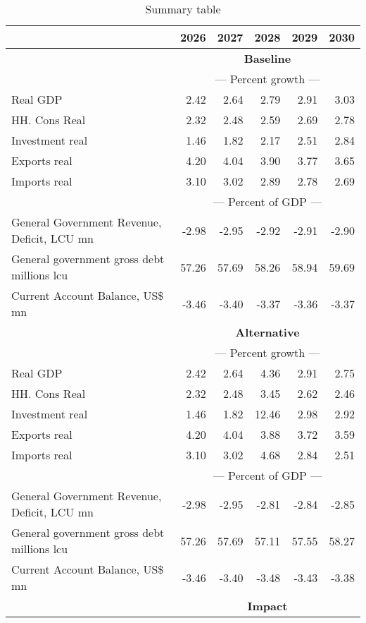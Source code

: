 \documentclass{article}
\begin{document}
\begin{table}[ht]
\caption{Summary table}
\begin{tabular}{lrrrrr}
\toprule
 & 2026 & 2027 & 2028 & 2029 & 2030 \\
\midrule
&\multicolumn{5}{c}{{\large \textbf{Baseline}}}                          \\
&\multicolumn{5}{c}{{---  Percent growth ---}}                          \\
Real GDP & 2.42 & 2.64 & 2.79 & 2.91 & 3.03 \\
HH. Cons Real & 2.32 & 2.48 & 2.59 & 2.69 & 2.78 \\
Investment real & 1.46 & 1.82 & 2.17 & 2.51 & 2.84 \\
Exports real & 4.20 & 4.04 & 3.90 & 3.77 & 3.65 \\
Imports real & 3.10 & 3.02 & 2.89 & 2.78 & 2.69 \\
&\multicolumn{5}{c}{{---  Percent of GDP ---}}                          \\
General Government Revenue, Deficit, LCU mn & -2.98 & -2.95 & -2.92 & -2.91 & -2.90 \\
General government gross debt millions lcu & 57.26 & 57.69 & 58.26 & 58.94 & 59.69 \\
Current Account Balance, US\$ mn & -3.46 & -3.40 & -3.37 & -3.36 & -3.37 \\
&\multicolumn{5}{c}{{\large \textbf{Alternative}}}                          \\
&\multicolumn{5}{c}{{---  Percent growth ---}}                          \\
Real GDP & 2.42 & 2.64 & 4.36 & 2.91 & 2.75 \\
HH. Cons Real & 2.32 & 2.48 & 3.45 & 2.62 & 2.46 \\
Investment real & 1.46 & 1.82 & 12.46 & 2.98 & 2.92 \\
Exports real & 4.20 & 4.04 & 3.88 & 3.72 & 3.59 \\
Imports real & 3.10 & 3.02 & 4.68 & 2.84 & 2.51 \\
&\multicolumn{5}{c}{{---  Percent of GDP ---}}                          \\
General Government Revenue, Deficit, LCU mn & -2.98 & -2.95 & -2.81 & -2.84 & -2.85 \\
General government gross debt millions lcu & 57.26 & 57.69 & 57.11 & 57.55 & 58.27 \\
Current Account Balance, US\$ mn & -3.46 & -3.40 & -3.48 & -3.43 & -3.38 \\
&\multicolumn{5}{c}{{\large \textbf{Impact}}}                          \\

\end{tabular}
\end{table}
\end{document}
